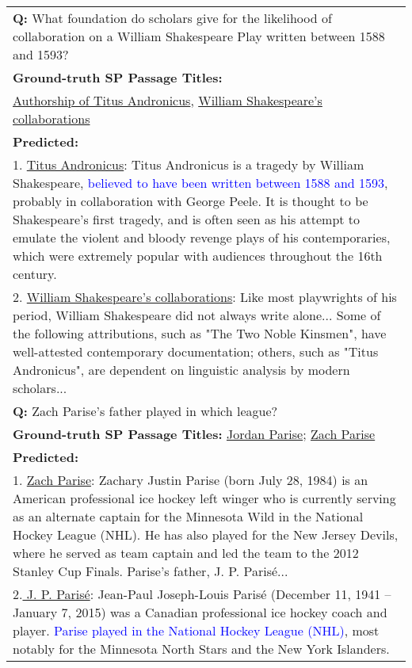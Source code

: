 \documentclass{article} \usepackage{iclr2021_conference,times}
\begin{document}
\begin{table*}[h]
\begin{tabular}{p{}}
    \midrule
    \textbf{Q:} What foundation do scholars give for the likelihood of collaboration on a William Shakespeare Play written between 1588 and 1593? \\
    \textbf{Ground-truth SP Passage Titles:}\\ \underline{Authorship of Titus Andronicus}, \underline{William Shakespeare's collaborations}\\
    \textbf{Predicted:}\\
    1. \underline{Titus Andronicus}: Titus Andronicus is a tragedy by William Shakespeare, \textcolor{blue}{believed to have been written between 1588 and 1593}, probably in collaboration with George Peele. It is thought to be Shakespeare's first tragedy, and is often seen as his attempt to emulate the violent and bloody revenge plays of his contemporaries, which were extremely popular with audiences throughout the 16th century.\\
    2. \underline{William Shakespeare's collaborations}:  Like most playwrights of his period, William Shakespeare did not always write alone... Some of the following attributions, such as "The Two Noble Kinsmen", have well-attested contemporary documentation; others, such as "Titus Andronicus", are dependent on linguistic analysis by modern scholars...\\
    \midrule 
    \textbf{Q:} Zach Parise's father played in which league? \\
    \textbf{Ground-truth SP Passage Titles:} \underline{Jordan Parise}; \underline{Zach Parise} \\
    \textbf{Predicted:}\\
    1. \underline{Zach Parise}: Zachary Justin Parise (born July 28, 1984) is an American professional ice hockey left winger who is currently serving as an alternate captain for the Minnesota Wild in the National Hockey League (NHL). He has also played for the New Jersey Devils, where he served as team captain and led the team to the 2012 Stanley Cup Finals. Parise's father, J. P. Parisé... \\
    2.\underline{ J. P. Parisé}: Jean-Paul Joseph-Louis Parisé (December 11, 1941 – January 7, 2015) was a Canadian professional ice hockey coach and player. \textcolor{blue}{Parise played in the National Hockey League (NHL)}, most notably for the Minnesota North Stars and the New York Islanders. \\
    \bottomrule
    \end{tabular}
    
    \label{tab:bridge_errors}
\end{table*}
\end{document}
